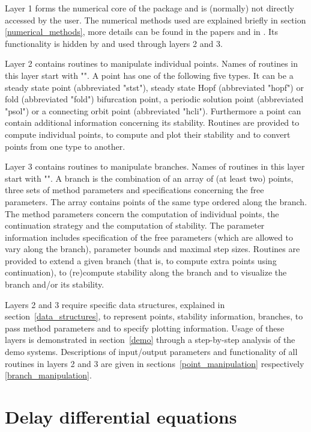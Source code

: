\documentclass[10pt]{article}
\gdef \file#1{{\bfseries{\ttfamily{#1}}}}
\begin{document}
Layer 1 forms the numerical core of the package and is (normally)
not directly accessed by the user. The numerical methods used
are explained
briefly in section \ref{numerical_methods}, more
details can be found in the papers 
\cite{Luzy96,Enge99a,Enge99b,en_d01,engel01,luz01,homoclinic}
and in \cite{Enge00}. Its functionality is hidden by and used
through layers 2 and 3.

Layer 2 contains routines to manipulate individual points. 
Names of routines in this layer start with "\file{p\_}".
A point has one of the following five types.
It can be a steady state point (abbreviated "stst"), 
steady state Hopf (abbreviated "hopf") or fold (abbreviated "fold")
bifurcation point, a periodic solution point
(abbreviated "psol") or a connecting orbit point
(abbreviated "hcli"). Furthermore
a point can contain additional information concerning its stability.
Routines are provided to compute individual points, to compute
and plot their
stability and to convert points from one type to another.

Layer 3 contains routines to manipulate branches. 
Names of routines in this layer start with "\file{br\_}". A branch
is the combination of an array of (at least two) 
points, three sets of method parameters and
specifications concerning the free parameters. 
The array contains points of the same type ordered along the
branch.  
The method parameters concern the computation 
of individual
points, the continuation strategy and the computation of stability.
The parameter information includes specification of the
free parameters (which are allowed to vary along the branch),
parameter bounds and maximal step sizes.
Routines are provided to extend a given branch (that is, to compute
extra points using continuation), to (re)compute stability along the branch
and to visualize the branch and/or its stability.

Layers 2 and 3 require specific data structures,
explained in section~\ref{data_structures}, to represent
points, stability information, branches, to pass method 
parameters and to specify plotting information.
Usage of these layers 
is demonstrated in section~\ref{demo}
through a step-by-step analysis of the demo systems.
Descriptions of input/output parameters and functionality
of all routines in layers 2 and 3 are given in 
sections~\ref{point_manipulation}
respectively \ref{branch_manipulation}. 

\section{Delay differential equations}\label{explain_dde}
\end{document}
